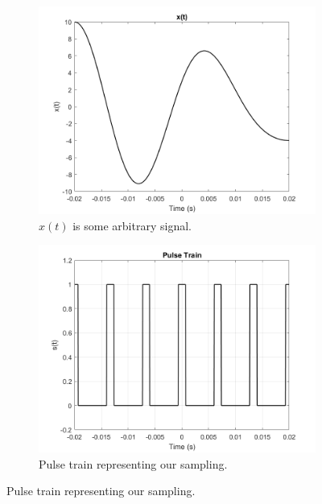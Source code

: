 \documentclass[12pt]{article}
\begin{document}
\begin{enumerate}[\qquad 1)]
\begin{figure}[htbp]
    \centering
    \begin{subfigure}[t]{0.48\textwidth}
        \centering
        \includegraphics[width=1.0\textwidth]{images/xt.png}
        \caption{$x(t)$ is some arbitrary signal.}
        \label{fig:image1}
    \end{subfigure}
    \begin{subfigure}[t]{0.48\textwidth}
        \centering
        \includegraphics[width=1.0\textwidth]{images/pulseTrain.png}
        \caption{Pulse train representing our sampling.}
        \label{fig:image2}
    \end{subfigure}


\end{figure}
\end{enumerate}
\end{document}
